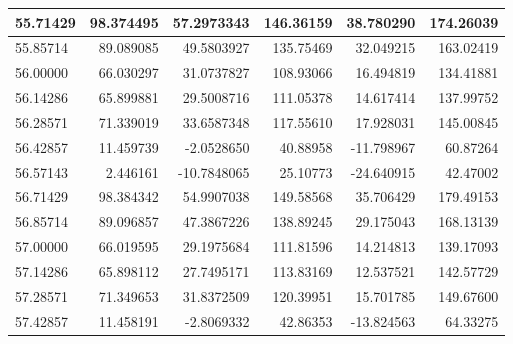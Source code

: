 \documentclass[openany]{book}
\begin{document}
\begin{table}[H]
\begin{tabular}{l|r|r|r|r|r}
\hline
\rowcolor{gray!6}  55.71429 & 98.374495 & 57.2973343 & 146.36159 & 38.780290 & 174.26039\\
\hline
55.85714 & 89.089085 & 49.5803927 & 135.75469 & 32.049215 & 163.02419\\
\hline
\rowcolor{gray!6}  56.00000 & 66.030297 & 31.0737827 & 108.93066 & 16.494819 & 134.41881\\
\hline
56.14286 & 65.899881 & 29.5008716 & 111.05378 & 14.617414 & 137.99752\\
\hline
\rowcolor{gray!6}  56.28571 & 71.339019 & 33.6587348 & 117.55610 & 17.928031 & 145.00845\\
\hline
56.42857 & 11.459739 & -2.0528650 & 40.88958 & -11.798967 & 60.87264\\
\hline
\rowcolor{gray!6}  56.57143 & 2.446161 & -10.7848065 & 25.10773 & -24.640915 & 42.47002\\
\hline
56.71429 & 98.384342 & 54.9907038 & 149.58568 & 35.706429 & 179.49153\\
\hline
\rowcolor{gray!6}  56.85714 & 89.096857 & 47.3867226 & 138.89245 & 29.175043 & 168.13139\\
\hline
57.00000 & 66.019595 & 29.1975684 & 111.81596 & 14.214813 & 139.17093\\
\hline
\rowcolor{gray!6}  57.14286 & 65.898112 & 27.7495171 & 113.83169 & 12.537521 & 142.57729\\
\hline
57.28571 & 71.349653 & 31.8372509 & 120.39951 & 15.701785 & 149.67600\\
\hline
\rowcolor{gray!6}  57.42857 & 11.458191 & -2.8069332 & 42.86353 & -13.824563 & 64.33275\\
\hline
\end{tabular}
\end{table}
\end{document}
